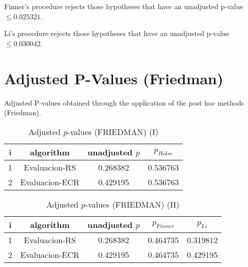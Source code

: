 \documentclass[a4paper,10pt]{article}
\begin{document}
\begin{landscape}
Finner's procedure rejects those hypotheses that have an unadjusted p-value $\le0.025321$.

Li's procedure rejects those hypotheses that have an unadjusted p-value $\le0.030042$.


\newpage

\section{Adjusted P-Values (Friedman)}


Adjusted P-values obtained through the application of the post hoc methods (Friedman).

\begin{table}[!htp]
\centering\small
\begin{tabular}{cccc}
i&algorithm&unadjusted $p$&$p_{Holm}$\\
\hline1&Evaluacion-RS&0.268382&0.536763\\2&Evaluacion-ECR&0.429195&0.536763\\\hline
\end{tabular}
\caption{Adjusted $p$-values (FRIEDMAN) (I)}
\end{table}
\begin{table}[!htp]
\centering\small
\begin{tabular}{ccccc}
i&algorithm&unadjusted $p$&$p_{Finner}$&$p_{Li}$\\
\hline1&Evaluacion-RS&0.268382&0.464735&0.319812\\2&Evaluacion-ECR&0.429195&0.464735&0.429195\\\hline
\end{tabular}
\caption{Adjusted $p$-values (FRIEDMAN) (II)}
\end{table}

\newpage
\end{landscape}
\end{document}
